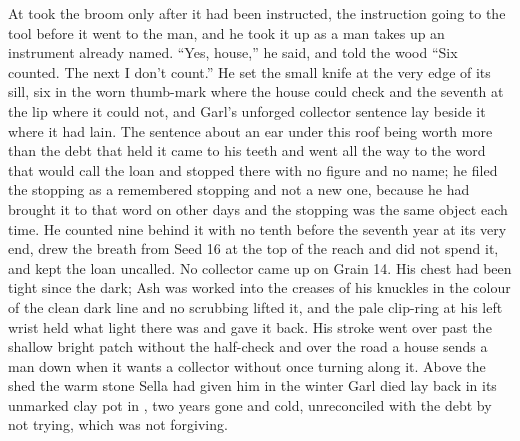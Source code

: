 At   took the broom only after it had been instructed, the instruction going to the tool before it went to the man, and he took it up as a man takes up an instrument already named. “Yes, house,” he said, and told the wood “Six counted. The next I don’t count.” He set the small knife at the very edge of its sill, six in the worn thumb-mark where the house could check and the seventh at the lip where it could not, and Garl's unforged collector sentence lay beside it where it had lain. The sentence about an ear under this roof being worth more than the debt that held it came to his teeth and went all the way to the word that would call the loan and stopped there with no figure and no name; he filed the stopping as a remembered stopping and not a new one, because he had brought it to that word on other days and the stopping was the same object each time. He counted nine behind it with no tenth before the seventh year at its very end, drew the breath from Seed 16 at the top of the reach and did not spend it, and kept the loan uncalled. No collector came up  on Grain 14. His chest had been tight since the dark; Ash was worked into the creases of his knuckles in the colour of the clean dark line and no scrubbing lifted it, and the pale clip-ring at his left wrist held what light there was and gave it back. His stroke went over  past the shallow bright patch without the half-check and over the road a house sends a man down when it wants a collector without once turning along it. Above the shed the warm stone Sella had given him in the winter Garl died lay back in its unmarked clay pot in , two years gone and cold, unreconciled with the debt by not trying, which was not forgiving.

\scenebreak

